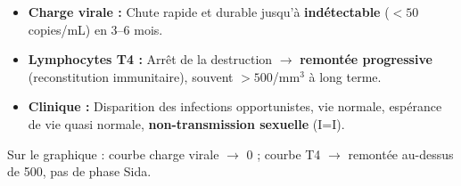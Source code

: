 \documentclass[11pt]{article}
\begin{document}
\begin{corrige}
\begin{enumerate}
\begin{itemize}
\item \textbf{Charge virale :} Chute rapide et durable jusqu'à \textbf{indétectable} ($< 50$ copies/mL) en 3--6 mois.
\item \textbf{Lymphocytes T4 :} Arrêt de la destruction $\rightarrow$ \textbf{remontée progressive} (reconstitution immunitaire), souvent $> 500$/mm$^3$ à long terme.
\item \textbf{Clinique :} Disparition des infections opportunistes, vie normale, espérance de vie quasi normale, \textbf{non-transmission sexuelle} (I=I).
\end{itemize}
Sur le graphique : courbe charge virale $\rightarrow$ 0 ; courbe T4 $\rightarrow$ remontée au-dessus de 500, pas de phase Sida.
\end{enumerate}
\end{corrige}
\end{document}
